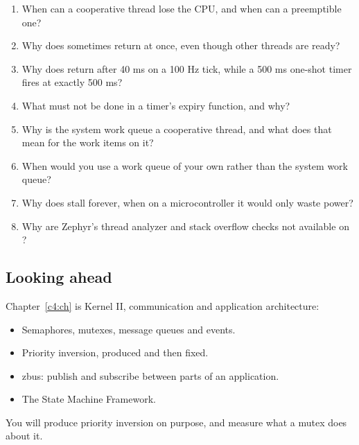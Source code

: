 \begin{enumerate}
  \item When can a cooperative thread lose the CPU, and when can a preemptible one?
  \item Why does  sometimes return at once, even though other threads are ready?
  \item Why does  return after 40 ms on a 100 Hz tick, while a 500 ms one-shot timer
    fires at exactly 500 ms?
  \item What must not be done in a timer’s expiry function, and why?
  \item Why is the system work queue a cooperative thread, and what does that mean for the work items on it?
  \item When would you use a work queue of your own rather than the system work queue?
  \item Why does  stall  forever, when on a microcontroller it
    would only waste power?
  \item Why are Zephyr’s thread analyzer and stack overflow checks not available on ?
\end{enumerate}

\subsection*{Looking ahead}
Chapter~\ref{c4:ch} is Kernel II, communication and application architecture:

\begin{itemize}
  \item Semaphores, mutexes, message queues and events.
  \item Priority inversion, produced and then fixed.
  \item zbus: publish and subscribe between parts of an application.
  \item The State Machine Framework.
\end{itemize}

You will produce priority inversion on purpose, and measure what a mutex does about it.
